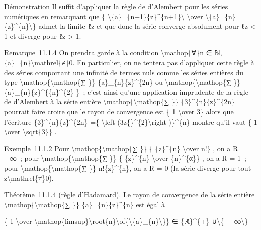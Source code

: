 \documentclass[]{article}
\begin{document}
Démonstration Il suffit d'appliquer la règle de d'Alembert pour les
séries numériques en remarquant que \{
\textbackslash{}\textbar{}\{a\}\_\{n+1\}\{z\}\^{}\{n+1\}\textbackslash{}\textbar{}
\textbackslash{}over
\textbackslash{}\textbar{}\{a\}\_\{n\}\{z\}\^{}\{n\}\textbackslash{}\textbar{}\}
admet la limite ℓ\textbar{}z\textbar{} et que donc la série converge
absolument pour ℓ\textbar{}z\textbar{} \textless{} 1 et diverge pour
ℓ\textbar{}z\textbar{} \textgreater{} 1.

Remarque~11.1.4 On prendra garde à la condition
\textbackslash{}mathop\{∀\}n ∈ ℕ,
\{a\}\_\{n\}\textbackslash{}mathrel\{≠\}0. En particulier, on ne tentera
pas d'appliquer cette règle à des séries comportant une infinité de
termes nuls comme les séries entières du type
\textbackslash{}mathop\{\textbackslash{}mathop\{∑ \}\}
\{a\}\_\{n\}\{z\}\^{}\{2n\} ou
\textbackslash{}mathop\{\textbackslash{}mathop\{∑ \}\}
\{a\}\_\{n\}\{z\}\^{}\{\{n\}\^{}\{2\} \}~; c'est ainsi qu'une
application imprudente de la règle de d'Alembert à la série entière
\textbackslash{}mathop\{\textbackslash{}mathop\{∑ \}\}
\{3\}\^{}\{n\}\{z\}\^{}\{2n\} pourrait faire croire que le rayon de
convergence est \{ 1 \textbackslash{}over 3\} alors que l'écriture
\textbar{}\{3\}\^{}\{n\}\{z\}\^{}\{2n\}\textbar{} =\{
\textbackslash{}left
(3\textbar{}z\{\textbar{}\}\^{}\{2\}\textbackslash{}right )\}\^{}\{n\}
montre qu'il vaut \{ 1 \textbackslash{}over \textbackslash{}sqrt\{3\}\}
.

Exemple~11.1.2 Pour \textbackslash{}mathop\{\textbackslash{}mathop\{∑
\}\} \{ \{z\}\^{}\{n\} \textbackslash{}over n!\} , on a R = +∞~; pour
\textbackslash{}mathop\{\textbackslash{}mathop\{∑ \}\} \{ \{z\}\^{}\{n\}
\textbackslash{}over \{n\}\^{}\{α\}\} , on a R = 1~; pour
\textbackslash{}mathop\{\textbackslash{}mathop\{∑ \}\} n!\{z\}\^{}\{n\},
on a R = 0 (la série diverge pour tout z\textbackslash{}mathrel\{≠\}0).

Théorème~11.1.4 (règle d'Hadamard). Le rayon de convergence de la série
entière \textbackslash{}mathop\{\textbackslash{}mathop\{∑ \}\}
\{a\}\_\{n\}\{z\}\^{}\{n\} est égal à

\{ 1 \textbackslash{}over
\textbackslash{}mathop\{limsup\}\textbackslash{}root\{n\}\textbackslash{}of\{\textbackslash{}\textbar{}\{a\}\_\{n\}\textbackslash{}\textbar{}\}\}
∈ \{ℝ\}\^{}\{+\} ∪\textbackslash{}\{ + ∞\textbackslash{}\}
\end{document}
